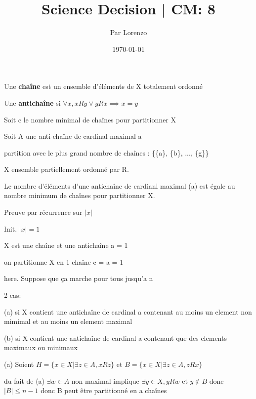 \documentclass[a4paper, 12pt]{article}
\title{Science Decision | CM: 8}
\author{Par Lorenzo}
\date{\today}
\begin{document}
\maketitle

\begin{definition}
    Une \textbf{chaîne} est un ensemble d'éléments de X totalement ordonné
\end{definition}

\begin{definition}
    Une \textbf{antichaîne} si $\forall x, xRy \lor yRx \implies x = y$
\end{definition}

Soit c le nombre minimal de chaînes pour partitionner X

Soit A une anti-chaîne de cardinal maximal a

\begin{remark}
    partition avec le plus grand nombre de chaînes : \{\{a\}, \{b\}, ..., \{g\}\}
\end{remark}

\begin{proposition}
    X ensemble partiellement ordonné par R.

    Le nombre d'éléments d'une antichaîne de cardianl maximal (a) est
    égale au nombre minimum de chaînes pour partitionner X.
\end{proposition}

\begin{demonstration}
    Preuve par récurrence sur $|x|$

    Init. $|x| = 1$

    X est une chaîne et une antichaîne a = 1

    on partitionne X en 1 chaîne c = a = 1

    here. Suppose que ça marche pour tous jusqu'a n

    2 cas:

    (a) si X contient une antichaîne de cardinal a contenant au moins un element non mimimal et au moins un element maximal

    (b) si X contient une antichaîne de cardinal a contenant que des elements maximaux ou minimaux

    (a) Soient $H = \{x \in X | \exists z \in A, xRz\}$ et $B = \{x \in X | \exists z \in A, zRx\}$

    du fait de (a) $\exists w \in A$ non maximal implique $\exists y \in X, yRw$ et $y \notin B$ donc $|B| \leq n - 1$
    donc B peut être partitionné en a chaînes
\end{demonstration}
\end{document}
